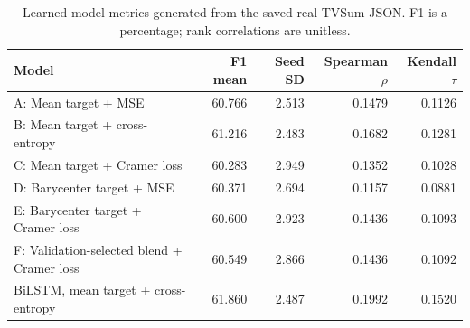 \begin{table}[ht]
\centering
\caption{Learned-model metrics generated from the saved real-TVSum JSON. F1 is a percentage; rank correlations are unitless.}
\label{tab:learned-metrics}
\begin{tabular}{lrrrr}
\toprule
Model & F1 mean & Seed SD & Spearman $\rho$ & Kendall $\tau$ \\
\midrule
A: Mean target + MSE & 60.766 & 2.513 & 0.1479 & 0.1126 \\
B: Mean target + cross-entropy & 61.216 & 2.483 & 0.1682 & 0.1281 \\
C: Mean target + Cramer loss & 60.283 & 2.949 & 0.1352 & 0.1028 \\
D: Barycenter target + MSE & 60.371 & 2.694 & 0.1157 & 0.0881 \\
E: Barycenter target + Cramer loss & 60.600 & 2.923 & 0.1436 & 0.1093 \\
F: Validation-selected blend + Cramer loss & 60.549 & 2.866 & 0.1436 & 0.1092 \\
BiLSTM, mean target + cross-entropy & 61.860 & 2.487 & 0.1992 & 0.1520 \\
\bottomrule
\end{tabular}
\end{table}
